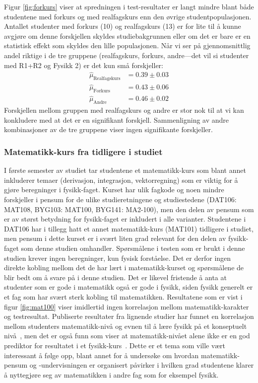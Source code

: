\documentclass[a4paper,norsk,12pt]{article}
\begin{document}
Figur \ref{fig:forkurs} viser at spredningen i test-resultater er langt mindre blant både studentene med forkurs og med realfagskurs enn den øvrige studentpopulasjonen. Antallet studenter med forkurs (10) og realfagskurs (13) er for lite til å kunne avgjøre om denne forskjellen skyldes studiebakgrunnen eller om det er bare er en statistisk effekt som skyldes den lille populasjonen. Når vi ser på gjennomsnittlig andel riktige i de tre gruppene (realfagskurs, forkurs, andre---det vil si studenter med R1+R2 og Fysikk 2) er det kun små forskjeller:
\begin{displaymath}
\begin{aligned}
	\hat{\mu}_\text{Realfagskurs} &= 0.39\pm 0.03 \\
	\hat{\mu}_\text{Forkurs} &= 0.43\pm0.06 \\
	\hat{\mu}_\text{Andre} &= 0.46\pm 0.02
\end{aligned}
\end{displaymath}
Forskjellen mellom gruppen med realfagskurs og andre er stor nok til at vi kan konkludere med at det er en signifikant forskjell. Sammenligning av andre kombinasjoner av de tre gruppene viser ingen signifikante forskjeller.

\subsubsection{Matematikk-kurs fra tidligere i studiet}
I første semester av studiet tar studentene et matematikk-kurs som blant annet inkluderer temaer (derivasjon, integrasjon, vektorregning) som er viktig for å gjøre beregninger i fysikk-faget. Kurset har ulik fagkode og noen mindre forskjeller i pensum for de ulike studieretningene og studiestedene (DAT106: MAT108, BYG103: MAT100, BYG141: MA2-100), men den delen av pensum som er av størst betydning for fysikk-faget er inkludert i alle varianter. Studentene i DAT106 har i tillegg hatt et annet matematikk-kurs (MAT101) tidligere i studiet, men pensum i dette kurset er i svært liten grad relevant for den delen av fysikk-faget som denne studien omhandler. Spørsmålene i testen som er brukt i denne studien krever ingen beregninger, kun fysisk forståelse. Det er derfor ingen direkte kobling mellom det de har lært i matematikk-kurset og spørsmålene de blir bedt om å svare på i denne studien. Det er likevel fristende å anta at studenter som er gode i matematikk også er gode i fysikk, siden fysikk generelt er et fag som har svært sterk kobling til matematikken. Resultatene som er vist i figur \ref{fig:mat100} viser imidlertid ingen korrelasjon mellom matematikk-karakter og testresultat. Publiserte resultater fra lignende studier har funnet en korrelasjon mellom studenters matematikk-nivå og evnen til å lære fysikk på et konseptuelt nivå~\cite{5c27a2a258c342bc822a508f17d2b0da}, men det er også funn som viser at matematikk-nivået alene ikke er en god prediktor for resultatet i et fysikk-kurs~\cite{VINITSKYPINSKY2014611}. Dette er et tema som ville vært interessant å følge opp, blant annet for å undersøke om hvordan matematikk-pensum og -undervisningen er organisert påvirker i hvilken grad studentene klarer  å nyttegjøre seg av matematikken i andre fag som for eksempel fysikk.
\end{document}
